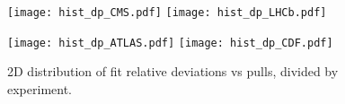 \documentclass{article}
\begin{document}
\clearpage

\begin{figure}
\centering
\texttt{[image: hist\_dp\_CMS.pdf]}
\texttt{[image: hist\_dp\_LHCb.pdf]}

\texttt{[image: hist\_dp\_ATLAS.pdf]}
\texttt{[image: hist\_dp\_CDF.pdf]}
\caption{2D distribution of fit relative deviations vs pulls, divided by experiment.}
\end{figure}

\clearpage
\restoregeometry



\pagebreak


\end{document}
